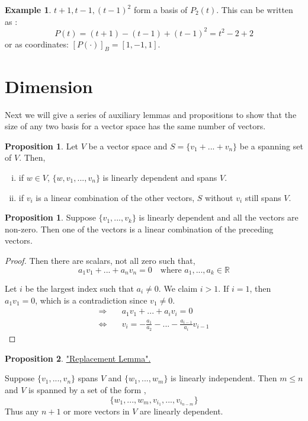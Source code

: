 \documentclass{report}
\theoremstyle{definition}
\newtheorem{ex}{Example}
\newtheorem{_prop}{Proposition}
\newtheorem{_lem}{Proposition}
\begin{document}
\begin{ex}
${t+1, t-1, (t-1)^2}$ form a basis of $P_2(t)$.
This can be written as :
\[P(t)=(t+1)-(t-1)+(t-1)^2=t^2-2+2\]
or as coordinates: $[P(\cdot)]_B=[1,-1,1]$.
\end{ex}

\section{Dimension}

Next we will give a series of auxiliary lemmas and propositions to show that the size of any two basis for a vector space has the same number of vectors.

\begin{_prop}
Let $V$ be a vector space and $S=\{v_1+...+v_n\}$ be a spanning set of $V$.
Then,
\begin{enumerate}[i)]
 \item if $w\in V$, $\{w,v_1,...,v_n\}$ is linearly dependent and spans $V$.
 \item if $v_i$ is a linear combination of the other vectors, $S$ without $v_i$ still spans $V$.
\end{enumerate}
\end{_prop}

\begin{_lem}
Suppose $\{v_1,...,v_k\}$ is linearly dependent and all the vectors are non-zero.
Then one of the vectors is a linear combination of the preceding vectors.
\end{_lem}
\begin{proof}
Then there are scalars, not all zero such that,
\[a_1v_1+...+a_nv_n=0 \quad \text{where } a_1,...,a_k\in\mathbb{R}\]

Let $i$ be the largest index such that $a_i\neq 0$.
We claim $i>1$.
If $i=1$, then $a_1v_1=0$, which is a contradiction since $v_1 \neq 0$.
\begin{align*}
\Rightarrow \quad & a_1v_1+...+a_iv_i=0 \\
\Leftrightarrow \quad & v_i=-\frac{a_1}{a_2}-...-\frac{a_{i-1}}{a_i}v_{i-1}
\end{align*}
\end{proof}

\begin{_lem} \underline{"Replacement Lemma".}

Suppose $\{v_1,...,v_n\}$ spans $V$ and $\{w_1,...,w_m\}$ is linearly independent.
Then $m\leq n$ and $V$ is spanned by a set of the form ,
\[\{w_1,...,w_m,v_{i_1},...,v_{i_{n-m}}\}\]
Thus any $n+1$ or more vectors in $V$ are linearly dependent.
\end{_lem}
\end{document}
